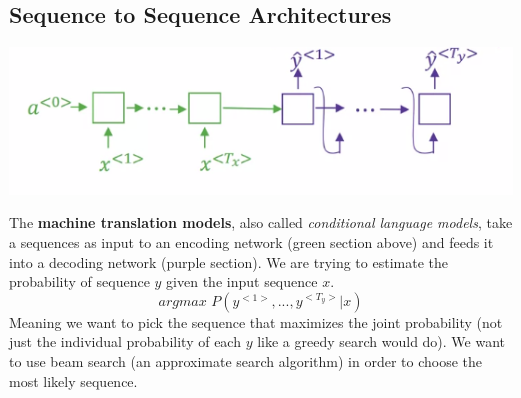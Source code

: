 \documentclass[11pt, a4paper]{article}
\begin{document}
\begin{spacing}{1.1}
	\subsection{Sequence to Sequence Architectures}
	\begin{center}
	\includegraphics[scale=.7]{m_tr}
	\end{center}
	The \textbf{machine translation models}, also called \textit{conditional language models}, take a sequences as input to an encoding network (green section above) and feeds it into a decoding network (purple section). We are trying to estimate the probability of sequence $y$ given the input sequence $x$.
	$$ argmax\,\, P(y^{<1>},...,y^{<T_y>}|x) $$
	Meaning we want to pick the sequence that maximizes the joint probability (not just the individual probability of each $y$ like a greedy search would do). We want to use beam search (an approximate search algorithm) in order to choose the most likely sequence.
	

\end{spacing}
\end{document}
